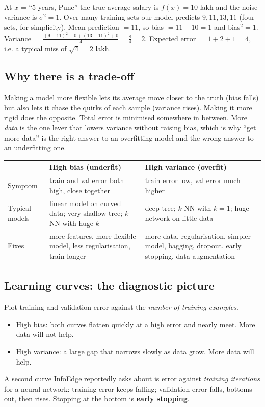 \begin{example}
At $x$ = ``5 years, Pune'' the true average salary is $f(x) = 10$ lakh and the noise variance is
$\sigma^2 = 1$. Over many training sets our model predicts $9, 11, 13, 11$ (four sets, for simplicity).
Mean prediction $= 11$, so bias $= 11 - 10 = 1$ and bias$^2 = 1$. Variance $= \frac{(9-11)^2 + 0 + (13-11)^2 + 0}{4}
= \frac{8}{4} = 2$. Expected error $= 1 + 2 + 1 = 4$, i.e. a typical miss of $\sqrt4 = 2$ lakh.
\end{example}

\subsection{Why there is a trade-off}
Making a model more flexible lets its average move closer to the truth (bias falls) but also lets it chase
the quirks of each sample (variance rises). Making it more rigid does the opposite. Total error is minimised
somewhere in between. More \emph{data} is the one lever that lowers variance without raising bias, which is
why ``get more data'' is the right answer to an overfitting model and the wrong answer to an underfitting one.

\begin{center}\small
\begin{tabularx}{\linewidth}{l X X}
\toprule
& High bias (underfit) & High variance (overfit)\\
\midrule
Symptom & train and val error both high, close together & train error low, val error much higher\\
Typical models & linear model on curved data; very shallow tree; $k$-NN with huge $k$ & deep tree; $k$-NN with
$k=1$; huge network on little data\\
Fixes & more features, more flexible model, less regularisation, train longer &
more data, regularisation, simpler model, bagging, dropout, early stopping, data augmentation\\
\bottomrule
\end{tabularx}
\end{center}

\subsection{Learning curves: the diagnostic picture}
Plot training and validation error against the \emph{number of training examples}.
\begin{itemize}
\item High bias: both curves flatten quickly at a high error and nearly meet. More data will not help.
\item High variance: a large gap that narrows slowly as data grow. More data will help.
\end{itemize}
A second curve InfoEdge reportedly asks about is error against \emph{training iterations} for a neural
network: training error keeps falling; validation error falls, bottoms out, then rises. Stopping at the
bottom is \textbf{early stopping}.

